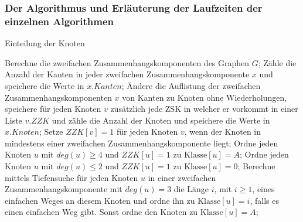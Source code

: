 \subsubsection{Der Algorithmus und Erläuterung der Laufzeiten der einzelnen Algorithmen}
\begin{algorithm}
\caption{Einteilung der Knoten}
\begin{algorithmic}[1]
\STATE Berechne die zweifachen Zusammenhangskomponenten des Graphen $G$;
 \ENDIF
\STATE Zähle die Anzahl der Kanten in jeder zweifachen Zusammenhangskomponente $x$ und speichere die Werte in $x.Kanten$;
\STATE Ändere die Auflistung der zweifachen Zusammenhangskomponenten $x$ von Kanten zu Knoten ohne Wiederholungen, speichere für jeden Knoten $v$ zusätzlich jede ZSK in welcher er vorkommt in einer Liste $v.ZZK$ und zähle die Anzahl der Knoten und speichere die Werte in $x.Knoten$;
\STATE Setze $ZZK[v]=1$ für jeden Knoten $v$, wenn der Knoten in mindestens einer zweifachen Zusammenhangskomponente liegt;
\STATE Ordne jeden Knoten $u$ mit $deg(u)\geq 4$ und $ZZK[u]=1$ zu $\text{Klasse}[u]=A$;
\STATE Ordne jeden Knoten $u$ mit $deg(u)\leq 2$ und $ZZK[u]=1$ zu $\text{Klasse}[u]=0$;
\STATE Berechne mittels Tiefensuche für jeden Knoten $u$ in einer zweifachen Zusammenhangskomponente mit $deg(u)=3$ die Länge $i$, mit $i \geq 1$, eines einfachen Weges an diesem Knoten und ordne ihn zu $\text{Klasse}[u]=i$, falls es einen einfachen Weg gibt. Sonst ordne den Knoten zu $\text{Klasse}[u]=A$;
{}
\ENDFOR
\end{algorithmic}
\label{alginit}
\end{algorithm}
